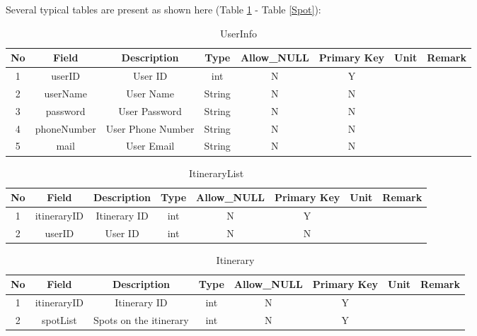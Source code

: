 \documentclass[10pt]{article}
\begin{document}
Several typical tables are present as shown here (Table \ref{UserInfo} - Table \ref{Spot}):

\begin{table}[htb]
	\centering

	\begin{tabular}{c|c|c|c|c|c|c|c} 
        \hline 
        No&Field&Description&Type&Allow\_NULL&Primary Key&Unit&Remark\\
		\hline
		1&userID&User ID&int&N&Y&&\\
		\hline
		2&userName&User Name&String&N&N&&\\
		\hline
		3&password&User Password&String&N&N&&\\
		\hline
		4&phoneNumber&User Phone Number&String&N&N&&\\
		\hline
		5&mail&User Email&String&N&N&&\\
		\hline
	\end{tabular}   
	
	\caption{UserInfo}\label{UserInfo}
\end{table}

\begin{table}[htb]
	\centering

	\begin{tabular}{c|c|c|c|c|c|c|c} 
        \hline 
        No&Field&Description&Type&Allow\_NULL&Primary Key&Unit&Remark\\
		\hline
		1&itineraryID&Itinerary ID&int&N&Y&&\\
		\hline
		2&userID&User ID&int&N&N&&\\
		\hline
	\end{tabular}   
	
	\caption{ItineraryList}\label{ItineraryList}
\end{table}

\begin{table}[htb]
	\centering

	\begin{tabular}{c|c|c|c|c|c|c|c} 
        \hline 
		No&Field&Description&Type&Allow\_NULL&Primary Key&Unit&Remark\\
		\hline
		1&itineraryID&Itinerary ID&int&N&Y&&\\
		\hline
		2&spotList&Spots on the itinerary&int&N&Y&&\\
	\end{tabular}   
	
	\caption{Itinerary}\label{Itinerary}
\end{table}
\end{document}
